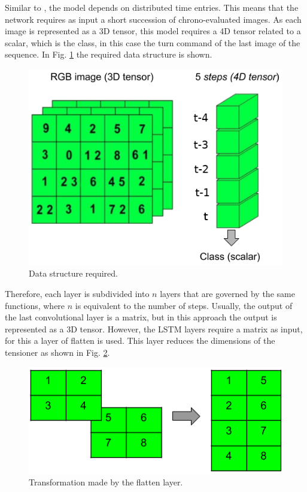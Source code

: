 \documentclass[conference]{IEEEtran}
\begin{document}
Similar to \cite{hassan2018convolutional}\cite{pinheiro2014recurrent}, the model depends on distributed time entries. This means that the network requires as input a short succession of chrono-evaluated images. As each image is represented as a 3D tensor, this model requires a 4D tensor related to a scalar, which is the class, in this case the turn command of the last image of the sequence. In Fig. \ref{fig:tensor} the required data structure is shown.

\begin{figure}[h]
	\centerline{\includegraphics[scale=0.3]{img/tensor}}
	\caption{Data structure required.}
	\label{fig:tensor}
\end{figure}

Therefore, each layer is subdivided into $n$ layers that are governed by the same functions, where $n$ is equivalent to the number of steps. Usually, the output of the last convolutional layer is a matrix, but in this approach the output is represented as a 3D tensor. However, the LSTM layers require a matrix as input, for this a layer of flatten is used. This layer reduces the dimensions of the tensioner as shown in Fig. \ref{fig:flatten}.

\begin{figure}[h]
	\centerline{\includegraphics[scale=0.3]{img/flatten}}
	\caption{Transformation made by the flatten layer.}
	\label{fig:flatten}
\end{figure}
\end{document}
